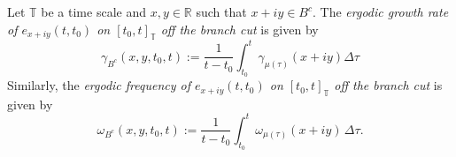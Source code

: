 \documentclass[reqno]{amsart}
\begin{document}
\begin{definition}
\label{def_gamma_omega} \rm
Let $\mathbb{T}$ be a time scale and $x,y \in \mathbb{R}$ such that $x+iy \in B^c$.
The \emph{ergodic growth rate of $e_{x+iy}(t,t_0)$ on $[t_0,t]_\mathbb{T}$ off the branch cut}
is given by
\begin{equation}
 \label{eq:gammatt0}
 \gamma_{B^c}(x,y,t_0,t) :=\frac{1}{t-t_0}\int_{t_0}^{t} \gamma_{\mu(\tau)}(x+iy)
 \Delta \tau
\end{equation}
Similarly, the \emph{ergodic frequency of $e_{x+iy}(t,t_0)$ on $[t_0,t]_\mathbb{T}$ off the
branch cut} is given by
 \begin{equation}
 \omega_{B^c}(x,y,t_0,t) := \frac{1}{t-t_0}\int_{t_0}^{t}
 \omega_{\mu(\tau)}(x+iy)\,\Delta \tau.\label{w}
 \end{equation}
\end{definition}
\end{document}
